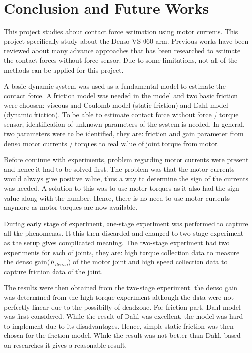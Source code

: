 \chapter{Conclusion and Future Works}

This project studies about contact force estimation using motor currents. This project specifically study about the Denso VS-060 arm. Previous works have been reviewed about many advance approaches that has been researched to estimate the contact forces without force sensor. Due to some limitations, not all of the methods can be applied for this project. 

A basic dynamic system was used as a fundamental model to estimate the contact force. A friction model was needed in the model and two basic friction were choosen: viscous and Coulomb model (static friction) and Dahl model (dynamic friction). To be able to estimate contact force without force / torque sensor, identification of unknown parameters of the system is needed. In general, two parameters were to be identified, they are: friction and gain parameter from denso motor currents / torques to real value of joint torque from motor. 

Before continue with experiments, problem regarding motor currents were present and hence it had to be solved first. The problem was that the motor currents would always give positive value, thus a way to determine the sign of the currents was needed. A solution to this was to use motor torques as it also had the sign value along with the number. Hence, there is no need to use motor currents anymore as motor torques are now available. 

During early stage of experiment, one-stage experiment was performed to capture all the phenomenas. It this then discarded and changed to two-stage experiment as the setup gives complicated meaning. The two-stage experiment had two experiments for each of joints, they are: high torque collection data to measure the denso gain($K_{denso}$) of the motor joint and high speed collection data to capture friction data of the joint.

The results were then obtained from the two-stage experiment. the denso gain was determined from the high torque experiment although the data were not perfectly linear due to the possibilty of deadzone. For friction part, Dahl model was first considered. While the result of Dahl was excellent, the model was hard to implement due to its disadvantages. Hence, simple static friction was then chosen for the friction model. While the result was not better than Dahl, based on researches it gives a reasonable result. 
